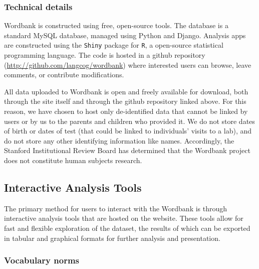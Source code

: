\documentclass[doc,noapacite]{apa2}
\newcommand{\comment}[1]{\marginpar[]{\small \textcolor{blue}{#1}}}
\begin{document}
\subsubsection{Technical details}

Wordbank is constructed using free, open-source tools. The database is a standard MySQL database, managed using Python and Django. Analysis apps are constructed using the \texttt{Shiny} package for \texttt{R}, a open-source statistical programming language.  The code is hosted in a github repository (\url{http://github.com/langcog/wordbank}) where interested users can browse, leave comments, or contribute modifications. 


All data uploaded to Wordbank is open and freely available for download, both through the site itself and through the github repository linked above. For this reason, we have chosen to host only de-identified data that cannot be linked by users or by us to the parents and children who provided it. We do not store dates of birth or dates of test (that could be linked to individuals' visits to a lab), and do not store any other identifying information like names. Accordingly, the Stanford Institutional Review Board has determined that the Wordbank project does not constitute human subjects research. \comment{Is this enough?}

\subsection{Interactive Analysis Tools}

The primary method for users to interact with the Wordbank is through interactive analysis tools that are hosted on the website. These tools allow for fast and flexible exploration of the dataset, the results of which can be exported in tabular and graphical formats for further analysis and presentation. 

\subsubsection{Vocabulary norms}
\end{document}
